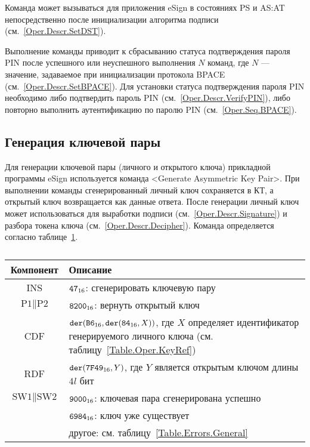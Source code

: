
Команда может вызываться для приложения eSign в состояниях 
PS и AS:AT непосредственно после инициализации алгоритма подписи
(см.~\ref{Oper.Descr.SetDST}).

Выполнение команды приводит к сбрасыванию статуса подтверждения пароля PIN
после успешного или неуспешного выполнения $N$ команд, где $N$ --- значение, 
задаваемое при инициализации протокола BPACE (см.~\ref{Oper.Descr.SetBPACE}).
Для установки статуса подтверждения пароля PIN 
необходимо либо подтвердить пароль PIN (см.~\ref{Oper.Descr.VerifyPIN}), 
либо повторно выполнить аутентификацию по паролю PIN (см.~\ref{Oper.Seq.BPACE}).


\subsection{Генерация ключевой пары}\label{Oper.Descr.GenKeys}

Для генерации ключевой пары (личного и открытого ключа) прикладной программы eSign
используется команда <Generate Asymmetric Key Pair>. При выполнении команды 
сгенерированный личный ключ сохраняется в КТ,
а открытый ключ возвращается как данные ответа.
После генерации личный ключ может использоваться 
для выработки подписи (см.~\ref{Oper.Descr.Signature}) и
разбора токена ключа (см.~\ref{Oper.Descr.Decipher}).
Команда определяется согласно 
таблице~\ref{Table.Oper.GenKeysCmd}.

\begin{table}[hbt]
\caption{}\label{Table.Oper.GenKeysCmd}
\begin{tabular}{|c|p{14cm}|}
\hline
Компонент & Описание\\
\hline
\hline
INS & $\texttt{47}_{16}$: сгенерировать ключевую пару \\
\hline
$\text{P1} \parallel\text{P2}$ & $\texttt{8200}_{16}$:
вернуть открытый ключ \\
\hline
CDF & $\texttt{der}(\texttt{B6}_{16},\texttt{der}(\texttt{84}_{16}, X))$,
где $X$ определяет идентификатор генерируемого личного ключа
(см. таблицу~\ref{Table.Oper.KeyRef}) \\
\hline 
RDF & $\texttt{der}(\texttt{7F49}_{16}, Y)$, где $Y$ является открытым ключом длины $4l$ бит\\
\hline
$\text{SW1} \parallel \text{SW2}$ & 
$\texttt{9000}_{16}$: ключевая пара сгенерирована успешно \\
  & $\texttt{6984}_{16}$: ключ уже существует \\
  & другое: см. таблицу~\ref{Table.Errors.General} \\
\hline
\end{tabular}
\end{table}

